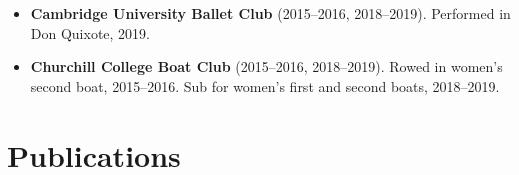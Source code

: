 \documentclass[11pt,a4paper,sans]{moderncv}   %
\def\addls{\vspace{2pt}}
\begin{document}
	\addls
	
	\begin{itemize}
		
		\item{\textbf{Cambridge University Ballet Club} (2015--2016, 2018--2019). Performed in Don Quixote, 2019.}
		
		\addls
		
		\item{\textbf{Churchill College Boat Club} (2015--2016, 2018--2019). Rowed in women's second boat, 2015--2016. Sub for women's first and second boats, 2018--2019.}
		
	\end{itemize}
	
	\addls
	
	\section{Publications}	
	
	\addls
	
\end{document}
